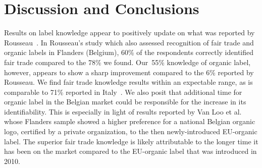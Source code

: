 \documentclass[sustainability,article,accept,moreauthors,pdftex,10pt,a4paper]{Definitions/mdpi}
\theoremstyle{mdpi}
\newcounter{ex}
\newcounter{re}
\theoremstyle{mdpidefinition}
\begin{document}
{%
\section{Discussion and Conclusions}\label{dconc}
\par{Results on label knowledge appear to positively update on what was reported by Rousseau~\cite{Rousseau2015}. In Rousseau's study which also assessed recognition of fair trade and organic labels in Flanders (Belgium), 60\%  of the respondents correctly identified fair trade compared to the 78\% we found. Our~55\% knowledge of organic label, however, appears to show a sharp improvement compared to the 6\% reported by Rousseau. We find fair trade knowledge results within an expectable range, as is comparable to 71\% reported in Italy~\cite{Gallenti2016}. We also posit that additional time for organic label in the Belgian market could be responsible for the increase in its identifiability. This is especially in light of results reported by Van Loo et al.~\cite{VanLoo2014} whose Flanders sample showed a higher preference for a national Belgian organic logo, certified by a private organization, to the then newly-introduced EU-organic label. The superior fair trade knowledge is likely attributable to the longer time it has been on the market compared to the EU-organic label that was introduced in 2010.}

}
\end{document}
